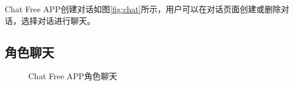 \documentclass{article}
\begin{document}
Chat Free APP创建对话如图\ref{fig:chat}所示，用户可以在对话页面创建或删除对话，选择对话进行聊天。

\newpage
\subsection{角色聊天}

\begin{figure}[h]
    \centering
    \caption{Chat Free APP角色聊天}
    \label{fig:role_chat}
\end{figure}
\end{document}
